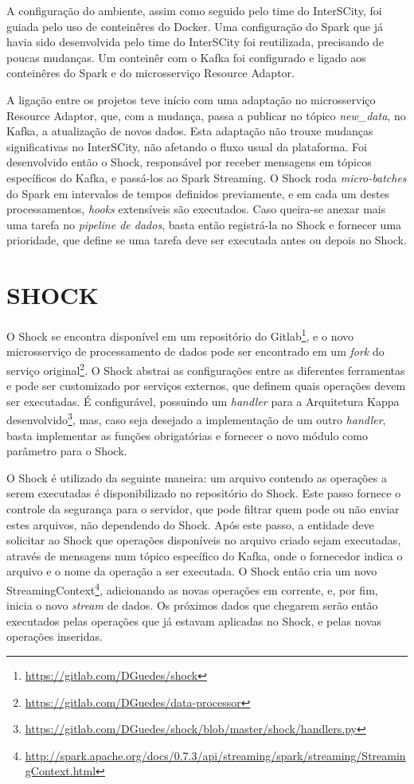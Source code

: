 A configuração do ambiente, assim como seguido pelo time do InterSCity, foi
guiada pelo uso de conteinêres do Docker. Uma configuração do Spark
que já havia sido desenvolvida pelo time do InterSCity foi reutilizada,
precisando de poucas mudanças. Um conteinêr com o Kafka foi configurado e
ligado aos conteinêres do Spark e do microsserviço Resource Adaptor.

A ligação entre os projetos teve início com uma adaptação no microsserviço
Resource Adaptor, que, com a mudança, passa a publicar no tópico
\textit{new\_data}, no Kafka, a atualização de novos dados. Esta
adaptação não trouxe mudanças significativas no InterSCity, não afetando o
fluxo usual da plataforma. Foi desenvolvido então o Shock, responsável por
receber mensagens em tópicos específicos do Kafka, e passá-los ao Spark
Streaming. O Shock roda \textit{micro-batches} do Spark em
intervalos de tempos definidos previamente, e em cada um destes processamentos,
\textit{hooks} extensíveis são executados. Caso queira-se anexar mais uma
tarefa no \textit{pipeline de dados}, basta então registrá-la no Shock e
fornecer uma prioridade, que define se uma tarefa deve ser executada antes ou
depois no Shock.

\section{SHOCK}

O Shock se encontra disponível em um repositório do
Gitlab\footnote{\url{https://gitlab.com/DGuedes/shock}}, e o novo microsserviço
de processamento de dados pode ser encontrado em um \textit{fork} do serviço
original\footnote{\url{https://gitlab.com/DGuedes/data-processor}}. O Shock
abstrai as configurações entre as diferentes ferramentas e pode ser customizado
por serviços externos, que definem quais operações devem ser executadas.
É configurável, possuindo um \textit{handler} para a Arquitetura Kappa
desenvolvido\footnote{\url{https://gitlab.com/DGuedes/shock/blob/master/shock/handlers.py}},
mas, caso seja desejado a implementação de um outro \textit{handler}, basta
implementar as funções obrigatórias e fornecer o novo módulo como parâmetro
para o Shock.

O Shock é utilizado da seguinte maneira: um arquivo contendo as operações a
serem executadas é disponibilizado no repositório do Shock. Este passo fornece
o controle da segurança para o servidor, que pode filtrar quem pode ou não
enviar estes arquivos, não dependendo do Shock. Após este passo, a entidade
deve solicitar ao Shock que operações disponíveis no arquivo criado sejam
executadas, através de mensagens num tópico específico do Kafka, onde o
fornecedor indica o arquivo e o nome da operação a ser executada. O Shock
então cria um novo
StreamingContext\footnote{\url{http://spark.apache.org/docs/0.7.3/api/streaming/spark/streaming/StreamingContext.html}},
adicionando as novas operações em corrente, e, por fim, inicia o novo
\textit{stream} de dados. Os próximos dados que chegarem serão então executados
pelas operações que já estavam aplicadas no Shock, e pelas novas operações
inseridas.
